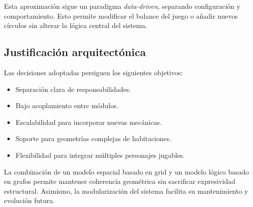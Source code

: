 Esta aproximación sigue un paradigma \textit{data-driven}, separando configuración y comportamiento. Esto permite modificar el balance del juego o añadir nuevos círculos sin alterar la lógica central del sistema.

\subsection{Justificación arquitectónica}

Las decisiones adoptadas persiguen los siguientes objetivos:

\begin{itemize}
    \item Separación clara de responsabilidades.
    \item Bajo acoplamiento entre módulos.
    \item Escalabilidad para incorporar nuevas mecánicas.
    \item Soporte para geometrías complejas de habitaciones.
    \item Flexibilidad para integrar múltiples personajes jugables.
\end{itemize}

La combinación de un modelo espacial basado en grid y un modelo lógico basado en grafos permite mantener coherencia geométrica sin sacrificar expresividad estructural. Asimismo, la modularización del sistema facilita su mantenimiento y evolución futura.